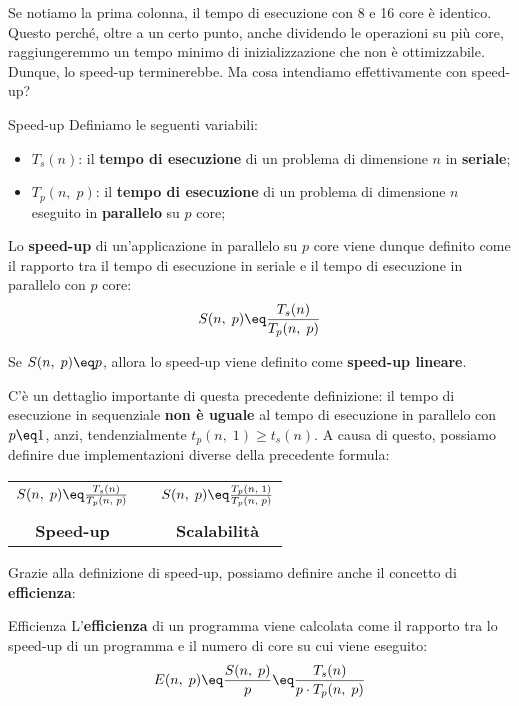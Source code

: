 
Se notiamo la prima colonna, il tempo di esecuzione con 8 e 16 core è identico. Questo perché, oltre a un certo punto, anche dividendo le operazioni su più core, raggiungeremmo un tempo minimo di inizializzazione che non è ottimizzabile. Dunque, lo speed-up terminerebbe. Ma cosa intendiamo effettivamente con speed-up?

\begin{definition}{Speed-up}
    Definiamo le seguenti variabili:
    \begin{itemize}
        \item $T_s(n)$: il \textbf{tempo di esecuzione} di un problema di dimensione $n$ in \textbf{seriale};
        \item $T_p(n, \; p)$: il \textbf{tempo di esecuzione} di un problema di dimensione $n$ eseguito in \textbf{parallelo} su $p$ core;
    \end{itemize}

    Lo \textbf{speed-up} di un'applicazione in parallelo su $p$ core viene dunque definito come il rapporto tra il tempo di esecuzione in seriale e il tempo di esecuzione in parallelo con $p$ core:
    \[ S(n, \; p) \eq \frac{T_s(n)}{T_p(n, \; p)} \]

    Se $S(n, \; p) \eq p$, allora lo speed-up viene definito come \textbf{speed-up lineare}.
\end{definition}

C'è un dettaglio importante di questa precedente definizione: il tempo di esecuzione in sequenziale \textbf{non è uguale} al tempo di esecuzione in parallelo con $p \eq 1$, anzi, tendenzialmente $t_p(n, \; 1) \geq t_s(n)$. A causa di questo, possiamo definire due implementazioni diverse della precedente formula:

\begin{center}
    \begin{tabular}{c c c}
        $S(n, \; p) \eq \frac{T_s(n)}{T_p(n, \; p)}$ & \quad \quad \quad \quad & $S(n, \; p) \eq \frac{T_p(n, \; 1)}{T_p(n, \; p)}$ \\ & & \\
        \textbf{Speed-up} & & \textbf{Scalabilità}
    \end{tabular}
\end{center}

Grazie alla definizione di speed-up, possiamo definire anche il concetto di \textbf{efficienza}:

\begin{definition}{Efficienza}
    L'\textbf{efficienza} di un programma viene calcolata come il rapporto tra lo speed-up di un programma e il numero di core su cui viene eseguito:
    \[ E(n, \; p) \eq \frac{S(n, \; p)}{p} \eq \frac{T_s(n)}{p \cdot T_p(n, \; p)} \]
\end{definition}


